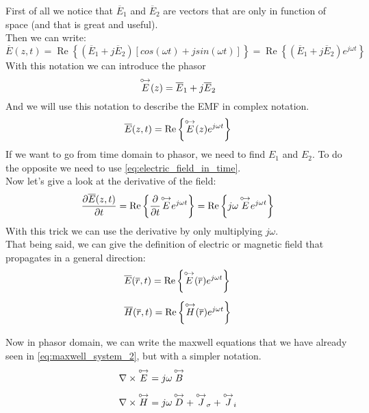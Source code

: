First of all we notice that $\overline{E}_1$ and $\overline{E}_2$ are vectors that are only in function of space (and that is great and useful).\\
Then we can write:
\begin{equation}
    \overline{E}(z,t)=\operatorname{Re}\left\{(\overline{E}_1+j\overline{E}_2)[cos(\omega t)+j sin(\omega t)]\right\}=\operatorname{Re}\left\{(\overline{E}_1+j\overline{E}_2)e^{j\omega t}\right\}
\end{equation}
With this notation we can introduce the phasor 
\begin{equation}
\overset{\mathbin {{\circ \mkern-2.5mu\rightarrow}}}{E}(z)=\overline{E}_1+j\overline{E}_2
\end{equation}
And we will use this notation to describe the EMF in complex notation.
\begin{equation}\label{eq:electric_field_in_time}
    \overline{E}(z,t)=\operatorname{Re}\left\{\overset{\mathbin {{\circ \mkern-2.5mu\rightarrow}}}{E}(z)e^{j\omega t}\right\}
\end{equation}
If we want to go from time domain to phasor, we need to find $E_1$ and $E_2$. To do the opposite we need to use \cref{eq:electric_field_in_time}.\\
Now let's give a look at the derivative of the field:
\begin{equation}
    \frac{\partial\overline{E}(z,t)}{\partial t}=\operatorname{Re}\left\{\frac{\partial}{\partial t}\overset{\mathbin {{\circ \mkern-2.5mu\rightarrow}}}{E}e^{j\omega t}\right\}=\operatorname{Re}\left\{j\omega\,\overset{\mathbin {{\circ \mkern-2.5mu\rightarrow}}}{E}e^{j\omega t}\right\}
\end{equation}
With this trick we can use the derivative by only multiplying $j\omega$.\\
That being said, we can give the definition of electric or magnetic field that propagates in a general direction:
\begin{align}
    \begin{split}
        &\overline{E}(\overline{r},t)=\operatorname{Re}\left\{\overset{\mathbin {{\circ \mkern-2.5mu\rightarrow}}}{E}(\overline{r})e^{j\omega t}\right\}\\[5pt]
        &\overline{H}(\overline{r},t)=\operatorname{Re}\left\{\overset{\mathbin {{\circ \mkern-2.5mu\rightarrow}}}{H}(\overline{r})e^{j\omega t}\right\}\\[5pt]
    \end{split}
\end{align}
Now in phasor domain, we can write the maxwell equations that we have already seen in \cref{eq:maxwell_system_2}, but with a simpler notation.
\begin{align}\label{eq:maxwell_equation_in_phasor}
    \begin{split}
        &\nabla\times\overset{\mathbin {{\circ \mkern-2.5mu\rightarrow}}}{E}=j\omega \,\overset{\mathbin {{\circ \mkern-2.5mu\rightarrow}}}{B}\\[5pt]
        &\nabla\times\overset{\mathbin {{\circ \mkern-2.5mu\rightarrow}}}{H}=j\omega \,\overset{\mathbin {{\circ \mkern-2.5mu\rightarrow}}}{D}+\overset{\mathbin {{\circ \mkern-2.5mu\rightarrow}}}{J}_\sigma+\overset{\mathbin {{\circ \mkern-2.5mu\rightarrow}}}{J}_i\\[5pt]
    \end{split}
\end{align}
